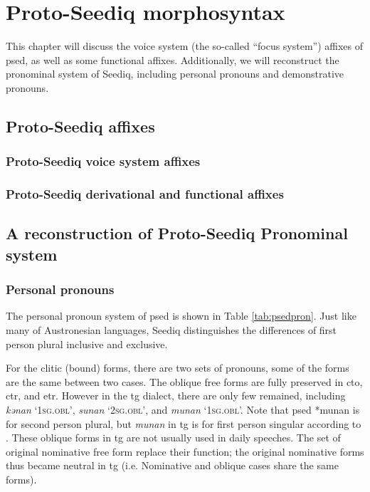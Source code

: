 \chapter{Proto-Seediq morphosyntax} \label{ch5}

This chapter will discuss the voice system (the so-called ``focus system'') affixes of \acl{psed}, as well as some functional affixes. Additionally, we will reconstruct the pronominal system of Seediq, including personal pronouns and demonstrative pronouns.

\section{Proto-Seediq affixes}
\lipsum[1]

\subsection{Proto-Seediq voice system affixes} \label{sec:psed_voice_affixes}
\lipsum[1-10]

\subsection{Proto-Seediq derivational and functional affixes}
\lipsum[1-10]

\section{A reconstruction of Proto-Seediq Pronominal system}
\lipsum[1]

\subsection{Personal pronouns}

The personal pronoun system of \acl{psed} is shown in Table \ref{tab:psedpron}. Just like many of Austronesian languages, Seediq distinguishes the differences of first person plural inclusive and exclusive. 

For the clitic (bound) forms, there are two sets of pronouns, some of the forms are the same between two cases. The oblique free forms are fully preserved in \acl{cto}, \acl{ctr}, and \acl{etr}. However in the \acl{tg} dialect, there are only few remained, including \textit{kənan} `\textsc{1sg.obl}', \textit{sunan} `\textsc{2sg.obl}', and \textit{munan} `\textsc{1sg.obl}'. Note that \acl{psed} *munan is for second person plural, but \textit{munan} in \acl{tg} is for first person singular according to \textcite[62]{Sung2018Sedgrammar}. These oblique forms in \acl{tg} are not usually used in daily speeches. The set of original nominative free form replace their function; the original nominative forms thus became neutral in \acl{tg} (i.e. Nominative and oblique cases share the same forms).

